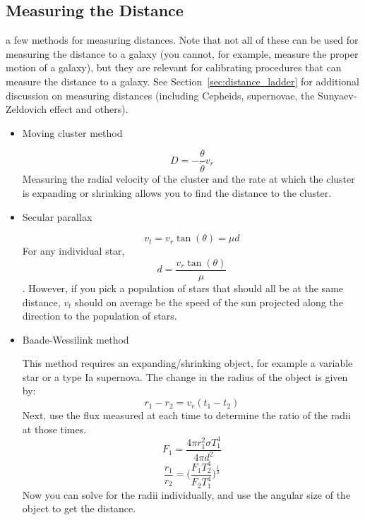 \subsection{Measuring the Distance}
 a few methods for measuring
distances.  Note that not all of these can be used for measuring
the distance to a galaxy (you cannot, for example, measure the
proper motion of a galaxy), but they are relevant for calibrating
procedures that can measure the distance to a galaxy.
See Section~\ref{sec:distance_ladder} for additional discussion on
measuring distances (including Cepheids, supernovae, the Sunyaev-Zeldovich effect and others).
\begin{itemize}
\item Moving cluster method

    \begin{equation}
    D = -\frac{\theta}{\dot \theta}v_r
    \end{equation}
    Measuring the radial velocity of the cluster and the rate at which the cluster
    is expanding or shrinking allows you to find the distance to the cluster.

\item Secular parallax

    \begin{equation}
    v_t = v_r\tan(\theta) = \mu d
    \end{equation}
    For any individual star,
    \begin{dmath}
    d = \frac{v_r\tan(\theta)}{\mu}
    \end{dmath}.
    However, if you pick a population of stars
    that should all be at the same distance, $v_t$
    should on average be the speed of the sun projected
    along the direction to the population of stars.

\item Baade-Wessilink method

    This method requires an expanding/shrinking object, for example a variable star or a
    type Ia supernova.  The change in the radius of the object is given by:
    \begin{equation}
    r_1 - r_2 = v_r(t_1 - t_2)
    \end{equation}
    Next, use the flux measured at each time to determine the ratio of the radii at those times.
    \begin{equation}
    F_1 = \frac{4\pi r_1^2\sigma T_1^4}{4\pi d^2}
    \end{equation}
    \begin{equation}
    \frac{r_1}{r_2} = \bigg(\frac{F_1T_2^4}{F_2T_1^4}\bigg)^{\frac{1}{2}}
    \end{equation}
    Now you can solve for the radii individually, and use the angular size of the object to
    get the distance.  

\end{itemize}

